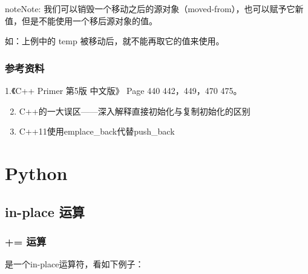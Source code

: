 \documentclass[letterpaper,10pt,english]{sphinxmanual}
\begin{document}
\begin{DUlineblock}{0em}
\item[] 
\end{DUlineblock}

\begin{sphinxadmonition}{note}{Note:}
我们可以销毁一个移动之后的源对象（moved-from），也可以赋予它新值，但是不能使用一个移后源对象的值。

如：上例中的 temp 被移动后，就不能再取它的值来使用。
\end{sphinxadmonition}


\subsection{参考资料}
\label{\detokenize{cpp/23_copyControl:id4}}
1.《C++ Primer 第5版 中文版》 Page 440 \textendash{} 442，449，470 \textendash{} 475。
\begin{enumerate}
\setcounter{enumi}{1}
\item {} 
C++的一大误区——深入解释直接初始化与复制初始化的区别

\end{enumerate}
\begin{quote}

\end{quote}
\begin{enumerate}
\setcounter{enumi}{2}
\item {} 
C++11使用emplace\_back代替push\_back

\end{enumerate}
\begin{quote}

\end{quote}


\chapter{Python}
\label{\detokenize{python/index:python}}\label{\detokenize{python/index::doc}}

\section{in-place 运算}
\label{\detokenize{python/01_inplace:in-place}}\label{\detokenize{python/01_inplace::doc}}

\subsection{+= 运算}
\label{\detokenize{python/01_inplace:id1}}
\sphinxcode{\sphinxupquote{+=}} 是一个in-place运算符，看如下例子：
\end{document}
